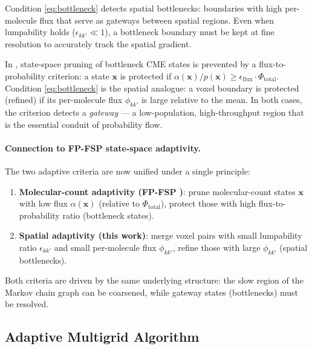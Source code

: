 \documentclass[review,onefignum,onetabnum]{siamart171218}
\newcommand{\bx}{\mathbf{x}}
\begin{document}
Condition \eqref{eq:bottleneck} detects spatial bottlenecks:
boundaries with high per-molecule flux that serve as gateways
between spatial regions.  Even when lumpability holds
($\epsilon_{kk'} \ll 1$), a bottleneck boundary must be kept
at fine resolution to accurately track the spatial gradient.

\begin{remark}
  In \cite{Dhumuntarao2024}, state-space pruning of
  bottleneck CME states is prevented by a flux-to-probability
  criterion: a state $\bx$ is protected if
  $\alpha(\bx)/p(\bx) \geq \epsilon_{\mathrm{flux}} \cdot
  \Phi_{\mathrm{total}}$.
  Condition \eqref{eq:bottleneck} is the spatial analogue:
  a voxel boundary is protected (refined) if its per-molecule
  flux $\phi_{kk'}$ is large relative to the mean.  In both
  cases, the criterion detects a \emph{gateway} --- a
  low-population, high-throughput region that is the essential
  conduit of probability flow.
\end{remark}

\paragraph{Connection to FP-FSP state-space adaptivity.}
The two adaptive criteria are now unified under a single
principle:

\begin{enumerate}
  \item \textbf{Molecular-count adaptivity (FP-FSP
    \cite{Dhumuntarao2024})}: prune molecular-count states
    $\bx$ with low flux $\alpha(\bx)$ (relative to
    $\Phi_{\mathrm{total}}$), protect those with high
    flux-to-probability ratio (bottleneck states).
  \item \textbf{Spatial adaptivity (this work)}: merge voxel
    pairs with small lumpability ratio $\epsilon_{kk'}$ and
    small per-molecule flux $\phi_{kk'}$, refine those with
    large $\phi_{kk'}$ (spatial bottlenecks).
\end{enumerate}

Both criteria are driven by the same underlying structure: the
slow region of the Markov chain graph can be coarsened, while
gateway states (bottlenecks) must be resolved.

\subsection{Adaptive Multigrid Algorithm}
\end{document}
